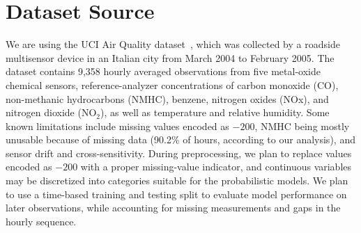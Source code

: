 \section{Dataset Source}
\label{sec:dataset}

We are using the UCI Air Quality dataset~\citep{vito2008airquality}, which was collected by a roadside multisensor device in an Italian city from March 2004 to February 2005. 
The dataset contains 9,358 hourly averaged observations from five metal-oxide chemical sensors, reference-analyzer concentrations of carbon monoxide (CO), non-methanic hydrocarbons (NMHC), benzene, nitrogen oxides (NOx), and nitrogen dioxide (NO$_2$), as well as temperature and relative humidity.
Some known limitations include missing values encoded as $-200$, NMHC being mostly unusable because of missing data (90.2\% of hours, according to our analysis), and sensor drift and cross-sensitivity. 
During preprocessing, we plan to replace values encoded as $-200$ with a proper missing-value indicator, and continuous variables may be discretized into categories suitable for the probabilistic models.
We plan to use a time-based training and testing split to evaluate model performance on later observations, while accounting for missing measurements and gaps in the hourly sequence.